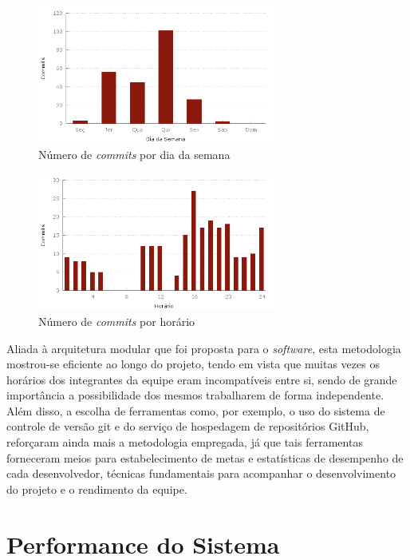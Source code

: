 \begin{figure}[!htb]
	\centering
	\includegraphics[width=0.7\textwidth]{./plots/day_of_week.png}
	\caption[Número de \emph{commits} por dia da semana]{Número de \emph{commits} por dia da semana}
	\label{fig:dayofweek}
\end{figure}

\begin{figure}[!htb]
	\centering
	\includegraphics[width=0.7\textwidth]{./plots/hour_of_day.png}
	\caption[Número de \emph{commits} por horário]{Número de \emph{commits} por horário}
	\label{fig:hourofday}
\end{figure}

Aliada à arquitetura modular que foi proposta para o \emph{software}, esta metodologia mostrou-se eficiente ao longo do projeto, tendo em vista que muitas vezes os horários dos integrantes da equipe eram incompatíveis entre si, sendo de grande importância a possibilidade dos mesmos trabalharem de forma independente.
Além disso, a escolha de ferramentas como, por exemplo, o uso do sistema de controle de versão git e do serviço de hospedagem de repositórios GitHub, reforçaram ainda mais a metodologia empregada, já que tais ferramentas forneceram meios para estabelecimento de metas e estatísticas de desempenho de cada desenvolvedor, técnicas fundamentais para acompanhar o desenvolvimento do projeto e o rendimento da equipe.

\section{Performance do Sistema}

